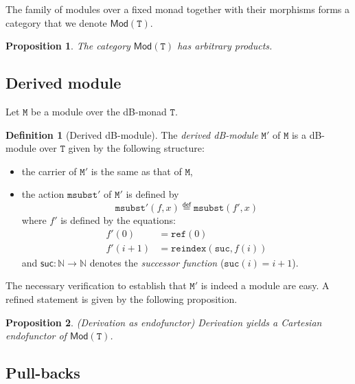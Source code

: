 \documentclass[a4paper,twoside,12pt]{article}
\newtheorem{proposition}{Proposition}
\theoremstyle{definition}
\newtheorem{definition}{Definition}
\theoremstyle{remark}
\theoremstyle{example}
\newcommand{\NN}{\mathbb{N}}
\newcommand{\TT}{\mathtt{T}}
\newcommand{\MM}{\mathtt{M}}
\newcommand{\refe}{\mathtt{ref}}
\newcommand{\reindex}{\mathtt{reindex}}
\newcommand{\msubst}{\mathtt{msubst}}
\begin{document}
The family of modules over a fixed monad together with their morphisms
forms a category that we denote $\mathsf{Mod}(\TT)$.

\begin{proposition}
  \label{prop:modules-product}
  The category $\mathsf{Mod}(\TT)$ has arbitrary products.
\end{proposition}

\subsection{Derived module}
\label{sec:derived-module}

Let $\MM$ be a module over the dB-monad $\TT$.

\begin{definition}[Derived dB-module]
  The \emph{derived dB-module} $\MM'$ of $\MM$ is a dB-module over
  $\TT$ given by the following structure:
  \begin{itemize}
  \item the carrier of $\MM'$ is the same as that of $\MM$,
  \item the action $\msubst'$ of $\MM'$ is defined by
    \begin{equation*}
    \msubst'(f,x) \stackrel{\mathsf{def}}{=} \msubst(f',x)
  \end{equation*}
  where $f'$ is defined by the equations:
  \begin{align*}
    f'(0) &= \refe(0)\\
    f'(i+1) &= \reindex(\mathtt{suc},f(i))
  \end{align*}
  and $\mathsf{suc} \colon \NN \to \NN$ denotes the \emph{successor
    function} ($\mathtt{suc}(i) = i+1$).
  \end{itemize}
\end{definition}

The necessary verification to establish that $\MM'$ is indeed a module
are easy.  A refined statement is given by the following proposition.

\begin{proposition}(Derivation as endofunctor)
  \label{prop:derivation-endo}
  Derivation yields a Cartesian endofunctor of $\mathsf{Mod}(\TT)$.
\end{proposition}

\subsection{Pull-backs}
\label{sec:pull-backs}
\end{document}
